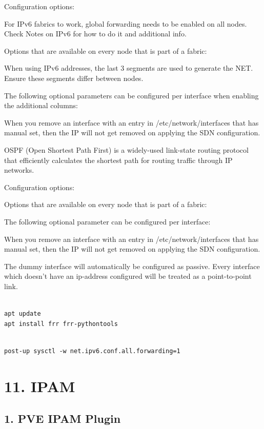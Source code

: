 Configuration options:

For IPv6 fabrics to work, global forwarding needs to be enabled on all nodes. Check Notes on IPv6 for how to do it and additional info.

Options that are available on every node that is part of a fabric:

When using IPv6 addresses, the last 3 segments are used to generate the NET. Ensure these segments differ between nodes.

The following optional parameters can be configured per interface when enabling the additional columns:

When you remove an interface with an entry in /etc/network/interfaces that has manual set, then the IP will not get removed on applying the SDN configuration.

OSPF (Open Shortest Path First) is a widely-used link-state routing protocol that efficiently calculates the shortest path for routing traffic through IP networks.

Configuration options:

Options that are available on every node that is part of a fabric:

The following optional parameter can be configured per interface:

When you remove an interface with an entry in /etc/network/interfaces that has manual set, then the IP will not get removed on applying the SDN configuration.

The dummy interface will automatically be configured as passive. Every interface which doesn’t have an ip-address configured will be treated as a point-to-point link.

\begin{lstlisting}

apt update
apt install frr frr-pythontools

\end{lstlisting}

\begin{lstlisting}

post-up sysctl -w net.ipv6.conf.all.forwarding=1

\end{lstlisting}


\section{11. IPAM}

\subsection{1. PVE IPAM Plugin}

